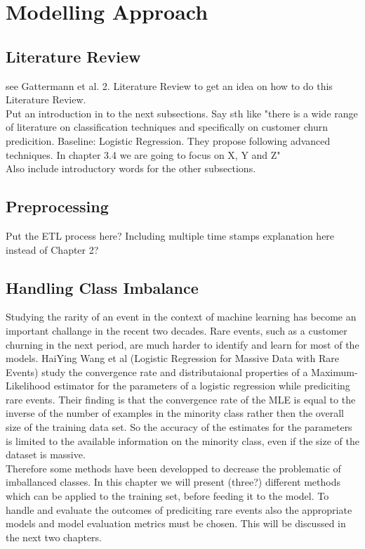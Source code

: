 \documentclass[12pt,titlepage]{article}
\begin{document}
\section{Modelling Approach} \par

\subsection{Literature Review} \par

see Gattermann et al. 2. Literature Review to get an idea on how to do this Literature Review. \\
Put an introduction in to the next subsections. Say sth like "there is a wide range of literature on classification techniques and specifically on customer churn predicition.
Baseline: Logistic Regression. They propose following advanced techniques. In chapter 3.4 we are going to focus on X, Y and Z" \\
Also include introductory words for the other subsections. \\

\subsection{Preprocessing} \par

Put the ETL process here? Including multiple time stamps explanation here instead of Chapter 2? \\

\subsection{Handling Class Imbalance} \par

Studying the rarity of an event in the context of machine learning has become an important challange in the recent two decades. Rare events, such as a customer churning in the
next period, are much harder to identify and learn for most of the models. HaiYing Wang et al (Logistic Regression for Massive Data with Rare Events) study the convergence rate
and distributaional properties of a Maximum-Likelihood estimator for the parameters of a logistic regression while prediciting rare events. Their finding is that the convergence
rate of the MLE is equal to the inverse of the number of examples in the minority class rather then the overall size of the training data set. So the accuracy of the estimates for
the parameters is limited to the available information on the minority class, even if the size of the dataset is massive. \\
Therefore some methods have been developped to decrease the problematic of imballanced classes. In
this chapter we will present (three?) different methods which can be applied to the training set, before feeding it to the model. To handle and evaluate the outcomes
of prediciting rare events also the appropriate models and model evaluation metrics must be chosen. This will be discussed in the next two chapters. \\
\end{document}
